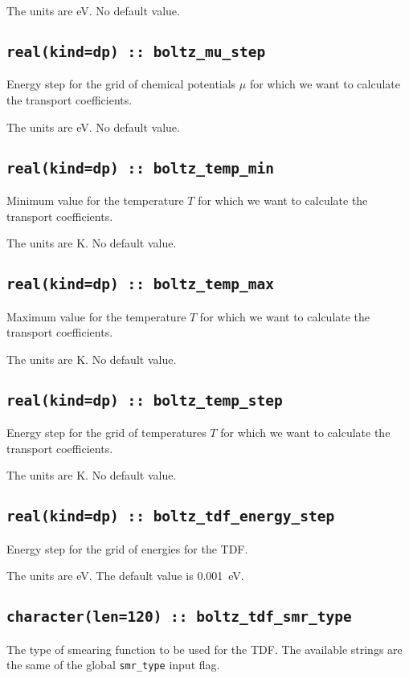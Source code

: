 The units are eV.
No default value.

\subsection[boltz\_mu\_step]{\tt real(kind=dp) :: boltz\_mu\_step}
Energy step for the grid of chemical potentials $\mu$ for which we want to calculate the transport coefficients.

The units are eV.
No default value.

\subsection[boltz\_temp\_min]{\tt real(kind=dp) :: boltz\_temp\_min}
Minimum value for the temperature $T$ for which we want to calculate the transport coefficients.

The units are K.
No default value.

\subsection[boltz\_temp\_max]{\tt real(kind=dp) :: boltz\_temp\_max}
Maximum value for the temperature $T$ for which we want to calculate the transport coefficients.

The units are K.
No default value.

\subsection[boltz\_temp\_step]{\tt real(kind=dp) :: boltz\_temp\_step}
Energy step for the grid of temperatures $T$ for which we want to calculate the transport coefficients.

The units are K.
No default value.

\subsection[boltz\_tdf\_energy\_step]{\tt real(kind=dp) :: boltz\_tdf\_energy\_step}
Energy step for the grid of energies for the TDF.

The units are eV.
The default value is 0.001~eV.

\subsection[boltz\_tdf\_smr\_type]{\tt character(len=120) :: boltz\_tdf\_smr\_type}
The type of smearing function to be used for the TDF. The available strings are the same of the global {\tt smr\_type} input flag. 

